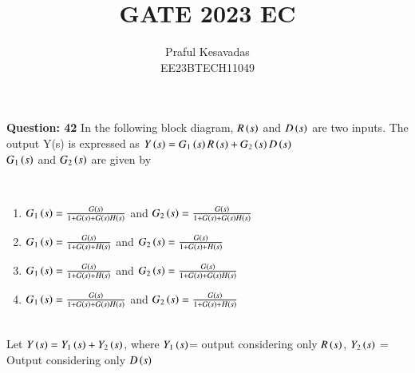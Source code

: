 \documentclass[journal,12pt,onecolumn]{IEEEtran}
\theoremstyle{remark}
\begin{document}
\let\vec\mathbf







\bigskip

\renewcommand{\thefigure}{\theenumi}
\renewcommand{\thetable}{\theenumi}


\title{GATE 2023 EC}
\author{Praful Kesavadas\\ EE23BTECH11049}
\maketitle

\textbf{Question: 42} In the following block diagram, $R\left(s\right)$ and $D\left(s\right)$ are two inputs. The output Y(s) is expressed as $Y\left(s\right) = G_1\left(s\right)R\left(s\right) + G_2\left(s\right)D\left(s\right)$\\
$G_1\left(s\right)$ and $G_2\left(s\right)$ are given by\\
\begin{figure}[htbp!]
\centering

\end{figure}\\
\begin{enumerate}[label=\alph*)]
\item $G_1\left(s\right) = \frac{G\left(s\right)}{1+G\left(s\right)+G\left(s\right)H\left(s\right)}$ and $G_2\left(s\right) = \frac{G\left(s\right)}{1+ G\left(s\right)+G\left(s\right)H\left(s\right)}$\\
\item $G_1\left(s\right) = \frac{G\left(s\right)}{1+G\left(s\right)+H\left(s\right)}$ and $G_2\left(s\right) = \frac{G\left(s\right)}{1+ G\left(s\right)+H\left(s\right)}$\\
\item $G_1\left(s\right) = \frac{G\left(s\right)}{1+G\left(s\right)+H\left(s\right)}$ and $G_2\left(s\right) = \frac{G\left(s\right)}{1+ G\left(s\right)+G\left(s\right)H\left(s\right)}$\\
\item $G_1\left(s\right) = \frac{G\left(s\right)}{1+G\left(s\right)+G\left(s\right)H\left(s\right)}$ and $G_2\left(s\right) = \frac{G\left(s\right)}{1+ G\left(s\right)+H\left(s\right)}$\\
\end{enumerate}
\solution\\
Let $Y\left(s\right)= Y_1\left(s\right) + Y_2\left(s\right)$, where $Y_1\left(s\right)$= output considering only $R\left(s\right)$, $Y_2\left(s\right)$ = Output considering only $D\left(s\right)$\\
\end{document}
